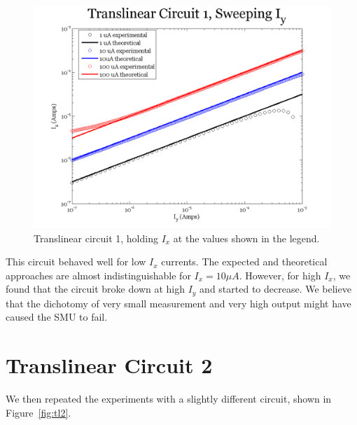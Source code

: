\documentclass{article}
\begin{document}
\begin{figure}[H]
\begin{center}
\includegraphics[scale=.75]{exp2_sweepy.png}
\caption{Translinear circuit 1, holding $I_x$ at the values shown in the legend.}
\label{fig:exp2sweepy}
\end{center}
\end{figure}

This circuit behaved well for low $I_x$ currents.  The expected and theoretical approaches are almost indistinguishable for $I_x = 10 \mu A$.  However, for high $I_x$, we found that the circuit broke down at high $I_y$ and started to decrease.  We believe that the dichotomy of very small measurement and very high output might have caused the SMU to fail.

\section*{Translinear Circuit 2}

We then repeated the experiments with a slightly different circuit, shown in Figure~\ref{fig:tl2}.
\end{document}
